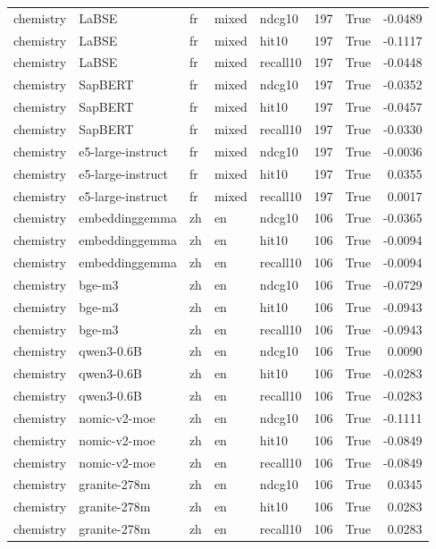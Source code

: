\begin{tabular}{lllllrrr}
chemistry & LaBSE & fr & mixed & ndcg10 & 197 & True & -0.0489 \\
chemistry & LaBSE & fr & mixed & hit10 & 197 & True & -0.1117 \\
chemistry & LaBSE & fr & mixed & recall10 & 197 & True & -0.0448 \\
chemistry & SapBERT & fr & mixed & ndcg10 & 197 & True & -0.0352 \\
chemistry & SapBERT & fr & mixed & hit10 & 197 & True & -0.0457 \\
chemistry & SapBERT & fr & mixed & recall10 & 197 & True & -0.0330 \\
chemistry & e5-large-instruct & fr & mixed & ndcg10 & 197 & True & -0.0036 \\
chemistry & e5-large-instruct & fr & mixed & hit10 & 197 & True & 0.0355 \\
chemistry & e5-large-instruct & fr & mixed & recall10 & 197 & True & 0.0017 \\
chemistry & embeddinggemma & zh & en & ndcg10 & 106 & True & -0.0365 \\
chemistry & embeddinggemma & zh & en & hit10 & 106 & True & -0.0094 \\
chemistry & embeddinggemma & zh & en & recall10 & 106 & True & -0.0094 \\
chemistry & bge-m3 & zh & en & ndcg10 & 106 & True & -0.0729 \\
chemistry & bge-m3 & zh & en & hit10 & 106 & True & -0.0943 \\
chemistry & bge-m3 & zh & en & recall10 & 106 & True & -0.0943 \\
chemistry & qwen3-0.6B & zh & en & ndcg10 & 106 & True & 0.0090 \\
chemistry & qwen3-0.6B & zh & en & hit10 & 106 & True & -0.0283 \\
chemistry & qwen3-0.6B & zh & en & recall10 & 106 & True & -0.0283 \\
chemistry & nomic-v2-moe & zh & en & ndcg10 & 106 & True & -0.1111 \\
chemistry & nomic-v2-moe & zh & en & hit10 & 106 & True & -0.0849 \\
chemistry & nomic-v2-moe & zh & en & recall10 & 106 & True & -0.0849 \\
chemistry & granite-278m & zh & en & ndcg10 & 106 & True & 0.0345 \\
chemistry & granite-278m & zh & en & hit10 & 106 & True & 0.0283 \\
chemistry & granite-278m & zh & en & recall10 & 106 & True & 0.0283 \\

\end{tabular}
